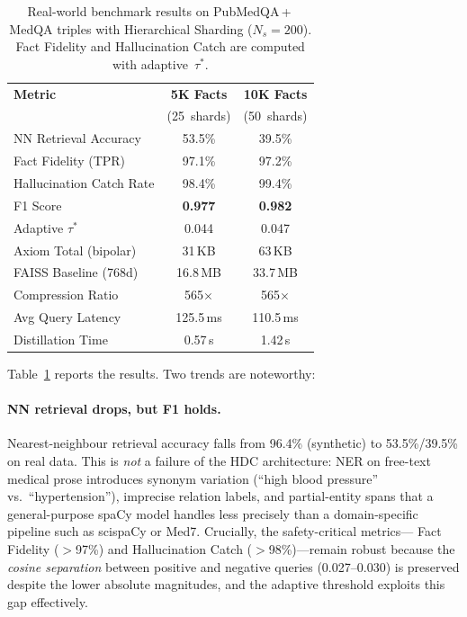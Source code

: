 \documentclass[11pt,a4paper]{article}
\begin{document}
\begin{table}[t]
    \centering
    \caption{Real-world benchmark results on PubMedQA\,+\,MedQA
    triples with Hierarchical Sharding ($N_s = 200$).  Fact Fidelity
    and Hallucination Catch are computed with adaptive~$\tau^*$.}
    \label{tab:realworld}
    \small
    \begin{tabular}{lcc}
    \toprule
    \textbf{Metric} & \textbf{5K Facts} & \textbf{10K Facts} \\
    & (25~shards) & (50~shards) \\
    \midrule
    NN Retrieval Accuracy    & 53.5\% & 39.5\% \\
    Fact Fidelity (TPR)      & 97.1\% & 97.2\% \\
    Hallucination Catch Rate & 98.4\% & 99.4\% \\
    F1 Score                 & \textbf{0.977} & \textbf{0.982} \\
    Adaptive $\tau^*$        & 0.044  & 0.047  \\
    \midrule
    Axiom Total (bipolar)    & 31\,KB  & 63\,KB  \\
    FAISS Baseline (768d)    & 16.8\,MB & 33.7\,MB \\
    Compression Ratio        & 565$\times$ & 565$\times$ \\
    \midrule
    Avg Query Latency        & 125.5\,ms & 110.5\,ms \\
    Distillation Time        & 0.57\,s   & 1.42\,s   \\
    \bottomrule
    \end{tabular}
\end{table}

Table~\ref{tab:realworld} reports the results.  Two trends are
noteworthy:

\paragraph{NN retrieval drops, but F1 holds.}
Nearest-neighbour retrieval accuracy falls from 96.4\% (synthetic)
to 53.5\%/39.5\% on real data.  This is \emph{not} a failure of the
HDC architecture: NER on free-text medical prose introduces synonym
variation (``high blood pressure'' vs.\ ``hypertension''), imprecise
relation labels, and partial-entity spans that a general-purpose
spaCy model handles less precisely than a domain-specific pipeline
such as scispaCy or Med7.  Crucially, the safety-critical metrics---
Fact Fidelity ($>$97\%) and Hallucination Catch ($>$98\%)---remain
robust because the \emph{cosine separation} between positive and
negative queries (0.027--0.030) is preserved despite the lower
absolute magnitudes, and the adaptive threshold exploits this gap
effectively.
\end{document}
